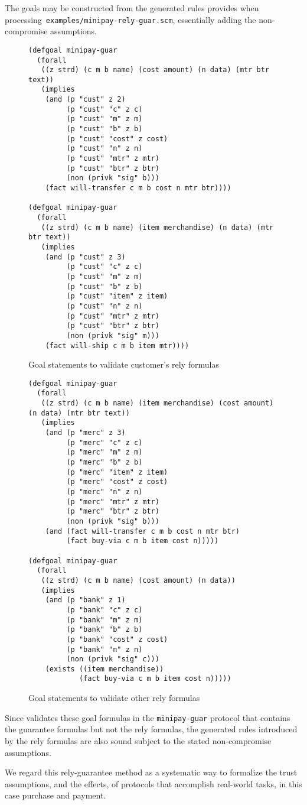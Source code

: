 The goals may be constructed from the generated rules {\cpsa} provides
when processing~\texttt{examples/minipay-rely-guar.scm}, essentially
adding the non-compromise assumptions.
%
\begin{figure}\small
\begin{verbatim}(defgoal minipay-guar
  (forall
   ((z strd) (c m b name) (cost amount) (n data) (mtr btr text))
   (implies
    (and (p "cust" z 2)
         (p "cust" "c" z c)
         (p "cust" "m" z m)
         (p "cust" "b" z b)
         (p "cust" "cost" z cost)
         (p "cust" "n" z n)
         (p "cust" "mtr" z mtr)
         (p "cust" "btr" z btr)
         (non (privk "sig" b)))
    (fact will-transfer c m b cost n mtr btr))))

(defgoal minipay-guar
  (forall
   ((z strd) (c m b name) (item merchandise) (n data) (mtr btr text))
   (implies
    (and (p "cust" z 3)
         (p "cust" "c" z c)
         (p "cust" "m" z m)
         (p "cust" "b" z b)
         (p "cust" "item" z item)
         (p "cust" "n" z n)
         (p "cust" "mtr" z mtr)
         (p "cust" "btr" z btr)
         (non (privk "sig" m)))
    (fact will-ship c m b item mtr))))
\end{verbatim}
  \caption[Goal statements, 1]{Goal statements to validate customer's rely formulas}
  \label{fig:rely:goals:cust}
\end{figure}

\begin{figure}\small
\begin{verbatim}(defgoal minipay-guar
  (forall
   ((z strd) (c m b name) (item merchandise) (cost amount) (n data) (mtr btr text))
   (implies
    (and (p "merc" z 3)
         (p "merc" "c" z c)
         (p "merc" "m" z m)
         (p "merc" "b" z b)
         (p "merc" "item" z item)
         (p "merc" "cost" z cost)
         (p "merc" "n" z n)
         (p "merc" "mtr" z mtr)
         (p "merc" "btr" z btr)
         (non (privk "sig" b)))
    (and (fact will-transfer c m b cost n mtr btr)
         (fact buy-via c m b item cost n)))))

(defgoal minipay-guar
  (forall
   ((z strd) (c m b name) (cost amount) (n data))
   (implies
    (and (p "bank" z 1)
         (p "bank" "c" z c)
         (p "bank" "m" z m)
         (p "bank" "b" z b)
         (p "bank" "cost" z cost)
         (p "bank" "n" z n)
         (non (privk "sig" c)))
    (exists ((item merchandise))
            (fact buy-via c m b item cost n))))) \end{verbatim}
  \caption[Goal statements]{Goal statements to validate other rely formulas}
  \label{fig:rely:goals:others}
\end{figure}
%
Since {\cpsa} validates these goal formulas in the
\texttt{minipay-guar} protocol that contains the guarantee formulas
but not the rely formulas, the generated rules introduced by the rely
formulas are also sound subject to the stated non-compromise
assumptions.

We regard this rely-guarantee method as a systematic way to formalize
the trust assumptions, and the effects, of protocols that accomplish
real-world tasks, in this case purchase and payment.

